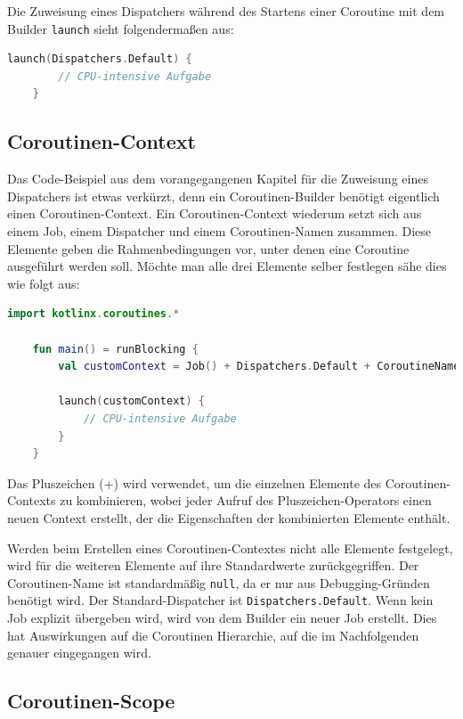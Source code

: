 \documentclass[fontsize=12pt,paper=a4,twoside=semi,parskip=half-,headsepline,headinclude]{scrreprt}
\begin{document}
Die Zuweisung eines Dispatchers während des Startens einer Coroutine mit dem Builder \texttt{launch} sieht folgendermaßen aus:

\begin{lstlisting}[language=Kotlin]
	launch(Dispatchers.Default) {
		// CPU-intensive Aufgabe
	}
\end{lstlisting}

\subsection{Coroutinen-Context}
\label{subsec:coroutinecontext}

Das Code-Beispiel aus dem vorangegangenen Kapitel für die Zuweisung eines Dispatchers ist etwas verkürzt, denn ein Coroutinen-Builder benötigt eigentlich einen Coroutinen-Context. Ein Coroutinen-Context wiederum setzt sich aus einem Job, einem Dispatcher und einem Coroutinen-Namen zusammen. Diese Elemente geben die Rahmenbedingungen vor, unter denen eine Coroutine ausgeführt werden soll. Möchte man alle drei Elemente selber festlegen sähe dies wie folgt aus:

\begin{lstlisting}[language=Kotlin]
	import kotlinx.coroutines.*

	fun main() = runBlocking {
		val customContext = Job() + Dispatchers.Default + CoroutineName("MyCoroutine")
	
		launch(customContext) {
			// CPU-intensive Aufgabe
		}
	}
\end{lstlisting}

Das Pluszeichen (+) wird verwendet, um die einzelnen Elemente des Coroutinen-Contexts zu kombinieren, wobei jeder Aufruf des Pluszeichen-Operators einen neuen Context erstellt, der die Eigenschaften der kombinierten Elemente enthält.

Werden beim Erstellen eines Coroutinen-Contextes nicht alle Elemente festgelegt, wird für die weiteren Elemente auf ihre Standardwerte zurückgegriffen. Der Coroutinen-Name ist standardmäßig \texttt{null}, da er nur aus Debugging-Gründen benötigt wird. Der Standard-Dispatcher ist \texttt{Dispatchers.Default}. Wenn kein Job explizit übergeben wird, wird von dem Builder ein neuer Job erstellt. Dies hat Auswirkungen auf die Coroutinen Hierarchie, auf die im Nachfolgenden genauer eingegangen wird.

\subsection{Coroutinen-Scope}
\label{subsec:coroutinescope}
\end{document}
